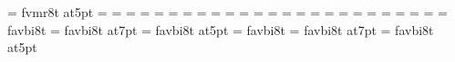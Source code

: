 \font\fivett=       fvmr8t at5pt
%
=\tenrm
{}=\sevenrm
{}=\fiverm
\def\rm{\fam=0 \tenrm}%
%
=\teni
{}=\seveni
{}=\fivei
\def\mit{\fam=1}%
%
=\tensy
{}=\sevensy
{}=\fivesy
\def\cal{\fam=2}%
%
=\twelveex
{}=\nineex
{}=\sevenex
%
\def\it{\fam=\itfam \tenit}%
\textfont\itfam=\tenit
\scriptfont\itfam=\sevenit
\scriptscriptfont\itfam=\fiveit
%
\def\sl{\fam=\slfam \tensl}%
\textfont\slfam=\tensl
\scriptfont\slfam=\sevensl
\scriptscriptfont\slfam=\fivesl
%
\def\bf{\fam=\bffam \tenbf}%
\textfont\bffam=\tenbf
\scriptfont\bffam=\sevenbf
\scriptscriptfont\bffam=\fivebf
%
\def\tt{\fam=\ttfam \tentt}%
\textfont\ttfam=\tentt
\scriptfont\ttfam=\seventt
\scriptscriptfont\ttfam=\fivett
%
\def\twentyitbf{\font\fzzozznzzt=   favbi8t at20pt \fzzozznzzt}%
\def\eighteenitbf{\font\fzzozznzzt= favbi8t at18pt \fzzozznzzt}%
\def\sixteenitbf{\font\fzzozznzzt=  favbi8t at16pt \fzzozznzzt}%
\def\fourteenitbf{\font\fzzozznzzt=    favbi8t at14pt \fzzozznzzt}%
\def\twelveitbf{\font\fzzozznzzt=   favbi8t at12pt \fzzozznzzt}%
\font\itbf=            favbi8t
\def\nineitbf{\font\fzzozznzzt=        favbi8t at9pt \fzzozznzzt}%
\def\eightitbf{\font\fzzozznzzt=       favbi8t at8pt \fzzozznzzt}%
\font\sevenitbf=       favbi8t at7pt
\def\sixitbf{\font\fzzozznzzt=         favbi8t at6pt \fzzozznzzt}%
\font\fiveitbf=        favbi8t at5pt
%
\def\twentyslbf{\font\fzzozznzzt=   favbi8t at20pt \fzzozznzzt}%
\def\eighteenslbf{\font\fzzozznzzt= favbi8t at18pt \fzzozznzzt}%
\def\sixteenslbf{\font\fzzozznzzt=  favbi8t at16pt \fzzozznzzt}%
\def\fourteenslbf{\font\fzzozznzzt=    favbi8t at14pt \fzzozznzzt}%
\def\twelveslbf{\font\fzzozznzzt=   favbi8t at12pt \fzzozznzzt}%
\font\slbf=            favbi8t
\def\nineslbf{\font\fzzozznzzt=        favbi8t at9pt \fzzozznzzt}%
\def\eightslbf{\font\fzzozznzzt=       favbi8t at8pt \fzzozznzzt}%
\font\sevenslbf=       favbi8t at7pt
\def\sixslbf{\font\fzzozznzzt=         favbi8t at6pt \fzzozznzzt}%
\font\fiveslbf=        favbi8t at5pt
%
\rm
